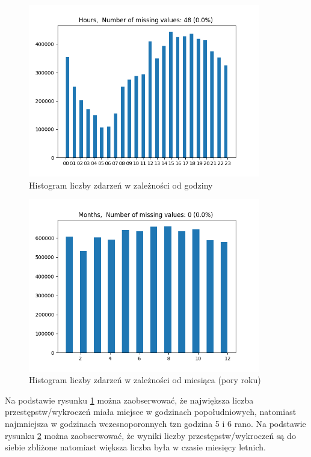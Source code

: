 \documentclass{classrep}
\begin{document}
{{{                \begin{figure}[!htbp]
                    \centering
                    \includegraphics[width=0.9\textwidth]{img/Hours-133549.png}
                    \caption{Histogram liczby zdarzeń w zależności od godziny}
                    \label{hist_hours}
                \end{figure}
                \begin{figure}[!htbp]
                    \centering
                    \includegraphics[width=0.9\textwidth]{img/Months-133554.png}
                    \caption{Histogram liczby zdarzeń w zależności od miesiąca (pory roku)}
                    \label{hist_months}
                \end{figure}
                \FloatBarrier

                Na podstawie rysunku \ref{hist_hours} można zaobserwować, że największa
                liczba przestępstw/wykroczeń miała miejsce w godzinach popołudniowych,
                natomiast najmniejsza w godzinach wczesnoporonnych tzn godzina 5 i 6 rano. Na podstawie rysunku \ref{hist_months} można zaobserwować, że wyniki
                liczby przestępstw/wykroczeń są do siebie zbliżone natomiast większa
                liczba była w czasie miesięcy letnich.
                
}}}
\end{document}
